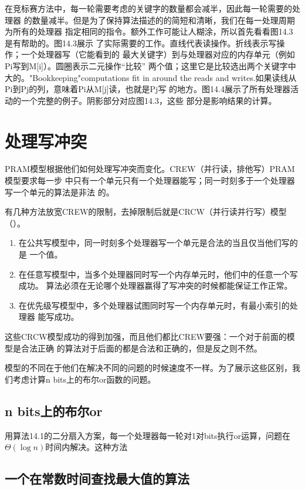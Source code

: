 在竞标赛方法中，每一轮需要考虑的关键字的数量都会减半，因此每一轮需要的处理器
的数量减半。但是为了保持算法描述的的简短和清晰，我们在每一处理周期为所有的处理器
指定相同的指令。额外工作可能让人糊涂，所以首先看看图14.3是有帮助的。图14.3展示
了实际需要的工作。直线代表读操作。折线表示写操作；一个处理器写（它能看到的
最大关键字）到与处理器对应的内存单元（例如Pi写到M[i]）。圆圈表示二元操作“比较”
两个值；这里它是比较选出两个关键字中大的。"Bookkeeping"computations fit in
around the reads and writes.如果读线从Pi到Pj的列，意味着Pi从M[j]读，也就是Pj写
的地方。图14.4展示了所有处理器活动的一个完整的例子。阴影部分对应图14.3，这些
部分是影响结果的计算。

\section{处理写冲突}
PRAM模型根据他们如何处理写冲突而变化。CREW（并行读，排他写）PRAM模型要求每一步
中只有一个单元只有一个处理器能写；同一时刻多于一个处理器写一个单元的算法是非法
的。

有几种方法放宽CREW的限制，去掉限制后就是CRCW（并行读并行写）模型（）。
\begin{enumerate}
\item 在公共写模型中，同一时刻多个处理器写一个单元是合法的当且仅当他们写的是
        一个值。
\item 在任意写模型中，当多个处理器同时写一个内存单元时，他们中的任意一个写成功。
        算法必须在无论哪个处理器赢得了写冲突的时候都能保证工作正常。
\item 在优先级写模型中，多个处理器试图同时写一个内存单元时，有最小索引的处理器
        能写成功。
\end{enumerate}
这些CRCW模型成功的得到加强，而且他们都比CREW要强：一个对于前面的模型是合法正确
的算法对于后面的都是合法和正确的，但是反之则不然。

模型的不同在于他们在解决不同的问题的时候速度不一样。为了展示这些区别，我们考虑计算n
bits上的布尔or函数的问题。

\subsection{n bits上的布尔or}
用算法14.1的二分扇入方案，每一个处理器每一轮对1对bits执行or运算，问题在
$\Theta(\log n)$时间内解决。这种方法
\subsection{一个在常数时间查找最大值的算法}
